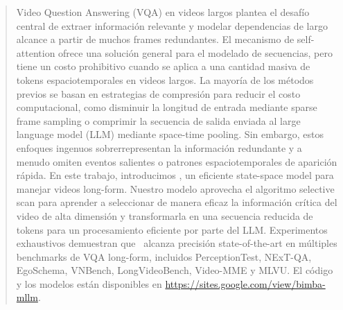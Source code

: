 \begin{abstract}

Video Question Answering (VQA) en videos largos plantea el desafío central de extraer información relevante y modelar dependencias de largo alcance a partir de muchos frames redundantes. El mecanismo de self-attention ofrece una solución general para el modelado de secuencias, pero tiene un costo prohibitivo cuando se aplica a una cantidad masiva de tokens espaciotemporales en videos largos. La mayoría de los métodos previos se basan en estrategias de compresión para reducir el costo computacional, como disminuir la longitud de entrada mediante sparse frame sampling o comprimir la secuencia de salida enviada al large language model (LLM) mediante space-time pooling. Sin embargo, estos enfoques ingenuos sobrerrepresentan la información redundante y a menudo omiten eventos salientes o patrones espaciotemporales de aparición rápida. En este trabajo, introducimos \model, un eficiente state-space model para manejar videos long-form. Nuestro modelo aprovecha el algoritmo selective scan para aprender a seleccionar de manera eficaz la información crítica del video de alta dimensión y transformarla en una secuencia reducida de tokens para un procesamiento eficiente por parte del LLM. Experimentos exhaustivos demuestran que \model\ alcanza precisión state-of-the-art en múltiples benchmarks de VQA long-form, incluidos PerceptionTest, NExT-QA, EgoSchema, VNBench, LongVideoBench, Video-MME y MLVU. El código y los modelos están disponibles en \url{https://sites.google.com/view/bimba-mllm}.


\end{abstract}
